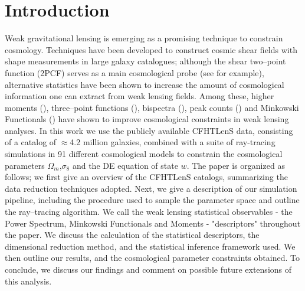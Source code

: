 \documentclass[reprint,aps,prd,superscriptaddress,showkeys,showpacs]{revtex4-1}
\begin{document}


\maketitle



\section{Introduction}
%

Weak gravitational lensing is emerging as a promising technique to constrain cosmology. Techniques have been developed to construct cosmic shear fields with shape measurements in large galaxy catalogues; although the shear two--point function (2PCF) serves as a main cosmological probe (see \citep{CFHTKilbinger} for example), alternative statistics have been shown to increase the amount of cosmological information one can extract from weak lensing fields. Among these, higher moments (\citep{moments1,moments2,moments3,moments4,moments5,moments6}), three--point functions (\citep{3pcf1,3pcf2}), bispectra (\citep{bispectrum1,bispectrum2,bispectrum3,bispectrum4}), peak counts (\citep{peaks1,peaks2,peaks3,peaks4,peaks5,peaks6}) and Minkowski Functionals (\citep{MinkJan,Petri2013}) have shown to improve cosmological constraints in weak lensing analyses.  
In this work we use the publicly available CFHTLenS data, consisting of a catalog of $\approx$4.2 million galaxies, combined with a suite of ray-tracing simulations in 91 different cosmological models to constrain the cosmological parameters $\Omega_m$,$\sigma_8$ and the DE equation of state $w$. The paper is organized as follows; we first give an overview of the CFHTLenS catalogs, summarizing the data reduction techniques adopted. Next, we give a description of our simulation pipeline, including the procedure used to sample the parameter space and outline the ray--tracing algorithm. We call the weak lensing statistical observables - the Power Spectrum, Minkowski Functionals and Moments - "descriptors" throughout the paper. We discuss the calculation of the statistical descriptors, the dimensional reduction method, and the statistical inference framework used. We then outline our results, and the cosmological parameter constraints obtained. To conclude, we discuss our findings and comment on possible future extensions of this analysis.  
\end{document}
